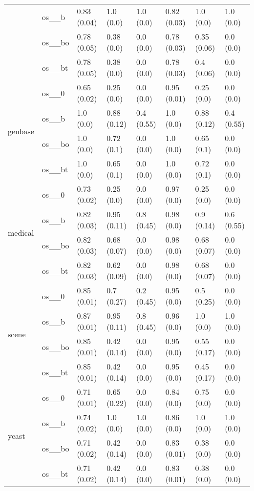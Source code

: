 \begin{tabular}{llllllll}
 & os__b & 0.83 (0.04) & 1.0 (0.0) & 1.0 (0.0) & 0.82 (0.03) & 1.0 (0.0) & 1.0 (0.0) \\
 & os__bo & 0.78 (0.05) & 0.38 (0.0) & 0.0 (0.0) & 0.78 (0.03) & 0.35 (0.06) & 0.0 (0.0) \\
 & os__bt & 0.78 (0.05) & 0.38 (0.0) & 0.0 (0.0) & 0.78 (0.03) & 0.4 (0.06) & 0.0 (0.0) \\
\cline{1-8}
\multirow[t]{4}{*}{genbase} & os__0 & 0.65 (0.02) & 0.25 (0.0) & 0.0 (0.0) & 0.95 (0.01) & 0.25 (0.0) & 0.0 (0.0) \\
 & os__b & 1.0 (0.0) & 0.88 (0.12) & 0.4 (0.55) & 1.0 (0.0) & 0.88 (0.12) & 0.4 (0.55) \\
 & os__bo & 1.0 (0.0) & 0.72 (0.1) & 0.0 (0.0) & 1.0 (0.0) & 0.65 (0.1) & 0.0 (0.0) \\
 & os__bt & 1.0 (0.0) & 0.65 (0.1) & 0.0 (0.0) & 1.0 (0.0) & 0.72 (0.1) & 0.0 (0.0) \\
\cline{1-8}
\multirow[t]{4}{*}{medical} & os__0 & 0.73 (0.02) & 0.25 (0.0) & 0.0 (0.0) & 0.97 (0.0) & 0.25 (0.0) & 0.0 (0.0) \\
 & os__b & 0.82 (0.03) & 0.95 (0.11) & 0.8 (0.45) & 0.98 (0.0) & 0.9 (0.14) & 0.6 (0.55) \\
 & os__bo & 0.82 (0.03) & 0.68 (0.07) & 0.0 (0.0) & 0.98 (0.0) & 0.68 (0.07) & 0.0 (0.0) \\
 & os__bt & 0.82 (0.03) & 0.62 (0.09) & 0.0 (0.0) & 0.98 (0.0) & 0.68 (0.07) & 0.0 (0.0) \\
\cline{1-8}
\multirow[t]{4}{*}{scene} & os__0 & 0.85 (0.01) & 0.7 (0.27) & 0.2 (0.45) & 0.95 (0.0) & 0.5 (0.25) & 0.0 (0.0) \\
 & os__b & 0.87 (0.01) & 0.95 (0.11) & 0.8 (0.45) & 0.96 (0.0) & 1.0 (0.0) & 1.0 (0.0) \\
 & os__bo & 0.85 (0.01) & 0.42 (0.14) & 0.0 (0.0) & 0.95 (0.0) & 0.55 (0.17) & 0.0 (0.0) \\
 & os__bt & 0.85 (0.01) & 0.42 (0.14) & 0.0 (0.0) & 0.95 (0.0) & 0.45 (0.17) & 0.0 (0.0) \\
\cline{1-8}
\multirow[t]{4}{*}{yeast} & os__0 & 0.71 (0.01) & 0.65 (0.22) & 0.0 (0.0) & 0.84 (0.0) & 0.75 (0.0) & 0.0 (0.0) \\
 & os__b & 0.74 (0.02) & 1.0 (0.0) & 1.0 (0.0) & 0.86 (0.0) & 1.0 (0.0) & 1.0 (0.0) \\
 & os__bo & 0.71 (0.02) & 0.42 (0.14) & 0.0 (0.0) & 0.83 (0.01) & 0.38 (0.0) & 0.0 (0.0) \\
 & os__bt & 0.71 (0.02) & 0.42 (0.14) & 0.0 (0.0) & 0.83 (0.01) & 0.38 (0.0) & 0.0 (0.0) \\
\cline{1-8}
\bottomrule
\end{tabular}
